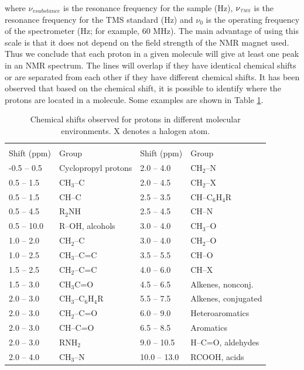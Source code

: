 \documentclass[byrevtex,amssymb,aps,pra,floatfix,letterpaper]{revtex4}
\begin{document}
\noindent
where $\nu_{vsubstance}$ is the resonance frequency for the sample (Hz), $\nu_{\textit{\tiny TMS}}$ is the resonance frequency for the TMS standard (Hz) and $\nu_0$ is the operating frequency of the spectrometer (Hz; for example, 60 MHz). The main advantage of using this scale is that it does not depend on the field strength of the NMR magnet used. Thus we conclude that each proton in a given molecule will give at least one peak in an NMR spectrum. The lines will overlap if they have identical chemical shifts or are separated from each other if they have different chemical shifts. It has been observed that based on the chemical shift, it is possible to identify where the protons are located in a molecule. Some examples are shown in Table \ref{table1}.

\begin{table}[!htp]
\caption{Chemical shifts observed for protons in different molecular environments. X denotes a halogen atom.}
\begin{tabular}{l@{\extracolsep{1cm}}l@{\extracolsep{4cm}}l@{\extracolsep{1cm}}l}
 & & & \\
Shift (ppm) & Group       &        Shift (ppm) & Group\\
-0.5 -- 0.5  & Cyclopropyl protons & 2.0 -- 4.0  & CH$_2$--N\\
0.5 -- 1.5  &  CH$_3$--C   &            2.0 -- 4.5 &  CH$_2$--X\\
0.5 -- 1.5  & CH--C        &        2.5 -- 3.5 &  CH--C$_6$H$_4$R\\
0.5 -- 4.5  & R$_2$NH      &        2.5 -- 4.5 &  CH--N\\
0.5 -- 10.0 & R--OH, alcohols  &    3.0 -- 4.0 &  CH$_3$--O\\
1.0 -- 2.0  & CH$_2$--C    &           3.0 -- 4.0 &  CH$_2$--O\\
1.0 -- 2.5  & CH$_3$--C=C  &           3.5 -- 5.5 &  CH--O\\
1.5 -- 2.5  & CH$_2$--C=C  &           4.0 -- 6.0 &  CH--X\\
1.5 -- 3.0  & CH$_3$C=O   &           4.5 -- 6.5 &  Alkenes, nonconj.\\
2.0 -- 3.0  & CH$_3$--C$_6$H$_4$R  &         5.5 -- 7.5 &  Alkenes, conjugated\\
2.0 -- 3.0  & CH$_2$--C=O  &           6.0 -- 9.0 &  Heteroaromatics\\
2.0 -- 3.0  & CH--C=O      &        6.5 -- 8.5 &  Aromatics\\
2.0 -- 3.0  & RNH$_2$      &          9.0 -- 10.5 &  H--C=O, aldehydes\\
2.0 -- 4.0  & CH$_3$--N    &           10.0 -- 13.0 & RCOOH, acids\\
\end{tabular}
\label{table1}
\end{table}
\end{document}
